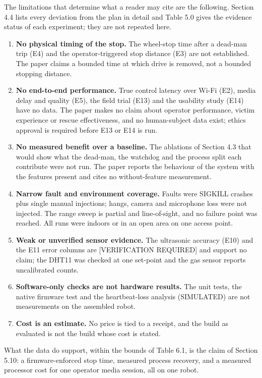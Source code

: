 The limitations that determine what a reader may cite are the following. Section 4.4 lists every deviation from the plan in detail and Table 5.0 gives the evidence status of each experiment; they are not repeated here.

\begin{enumerate}
\item \textbf{No physical timing of the stop.} The wheel-stop time after a dead-man trip (E4) and the operator-triggered stop distance (E3) are not established. The paper claims a bounded time at which drive is removed, not a bounded stopping distance.
\item \textbf{No end-to-end performance.} True control latency over Wi-Fi (E2), media delay and quality (E5), the field trial (E13) and the usability study (E14) have no data. The paper makes no claim about operator performance, victim experience or rescue effectiveness, and no human-subject data exist; ethics approval is required before E13 or E14 is run.
\item \textbf{No measured benefit over a baseline.} The ablations of Section 4.3 that would show what the dead-man, the watchdog and the process split each contribute were not run. The paper reports the behaviour of the system with the features present and cites no without-feature measurement.
\item \textbf{Narrow fault and environment coverage.} Faults were SIGKILL crashes plus single manual injections; hangs, camera and microphone loss were not injected. The range sweep is partial and line-of-sight, and no failure point was reached. All runs were indoors or in an open area on one access point.
\item \textbf{Weak or unverified sensor evidence.} The ultrasonic accuracy (E10) and the E11 error columns are [VERIFICATION REQUIRED] and support no claim; the DHT11 was checked at one set-point and the gas sensor reports uncalibrated counts.
\item \textbf{Software-only checks are not hardware results.} The unit tests, the native firmware test and the heartbeat-loss analysis (SIMULATED) are not measurements on the assembled robot.
\item \textbf{Cost is an estimate.} No price is tied to a receipt, and the build as evaluated is not the build whose cost is stated.
\end{enumerate}

What the data do support, within the bounds of Table 6.1, is the claim of Section 5.10: a firmware-enforced stop time, measured process recovery, and a measured processor cost for one operator media session, all on one robot.

